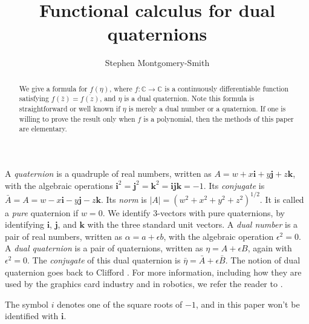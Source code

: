 \documentclass[12pt,reqno]{amsart}
\newcommand\bi{\bm i}
\newcommand\bj{\bm j}
\newcommand\bk{\bm k}
\begin{document}
\title{Functional calculus for dual quaternions}
\author{Stephen Montgomery-Smith}
\address{Department of Mathematics, University of Missouri, Columbia, MO 65211, USA\\
\rm\url{stephen@missouri.edu}\\
\rm\url{https://stephenmontgomerysmith.github.io}\\
}

\begin{abstract}  We give a formula for $f(\eta)$, where $f :\mathbb C \to \mathbb C$ is a continuously differentiable function satisfying
$f(\bar z) = \overline{f(z)}$,
and $\eta$ is a dual quaternion.  Note this formula is straightforward or well known if $\eta$ is merely a dual number or a quaternion.  If one is willing to prove the result only when $f$ is a polynomial, then the methods of this paper are elementary.
\end{abstract}



\maketitle

A \emph{quaternion} is a quadruple of real numbers, written as $A = w + x \bi + y \bj + z \bk$, with the algebraic operations $\bi^2 = \bj^2 = \bk^2 = \bi \bj \bk = -1$.  Its \emph{conjugate} is $\bar A = A = w - x \bi - y \bj - z \bk$.  Its \emph{norm} is $|A| = (w^2+x^2+y^2+z^2)^{1/2}$.  It is called a \emph{pure} quaternion if $w = 0$.  We identify 3-vectors with pure quaternions, by identifying $\bi$, $\bj$, and $\bk$ with the three standard unit vectors.  A \emph{dual number} is a pair of real numbers, written as $\alpha = a + \epsilon b$, with the algebraic operation $\epsilon^2 = 0$.  A \emph{dual quaternion} is a pair of quaternions, written as $\eta = A + \epsilon B$, again with $\epsilon^2 = 0$.  The \emph{conjugate} of this dual quaternion is $\bar \eta = \bar A + \epsilon \bar B$.  The notion of dual quaternion goes back to Clifford \cite{clifford}.  For more information, including how they are used by the graphics card industry and in robotics, we refer the reader to \cite{adorno,agrawal,han-et-al,kavan-et-al,kavan-et-al-2,kenwright,kussaba-et-al,schilling1,schilling2,wiki-2,yang-et-al}.

The symbol $i$ denotes one of the square roots of $-1$, and in this paper won't be identified with $\bi$.
\end{document}
